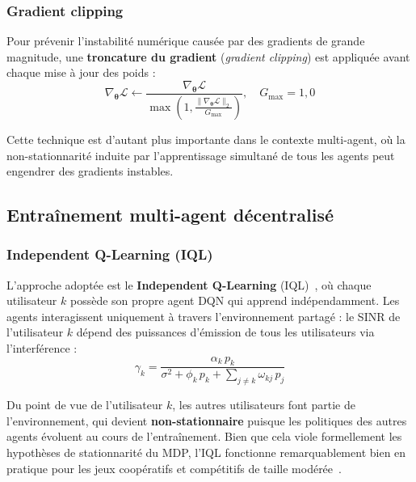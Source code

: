 \documentclass[conference]{IEEEtran}
\begin{document}
\subsubsection{Gradient clipping}
\label{sec:grad_clip}

Pour prévenir l'instabilité numérique causée par des gradients de grande magnitude, une \textbf{troncature du gradient} (\textit{gradient clipping}) est appliquée avant chaque mise à jour des poids :
\begin{equation}
    \nabla_{\boldsymbol{\theta}} \mathcal{L} \leftarrow \frac{\nabla_{\boldsymbol{\theta}} \mathcal{L}}{\max\!\left(1, \frac{\|\nabla_{\boldsymbol{\theta}} \mathcal{L}\|_2}{G_{\max}}\right)}, \quad G_{\max} = 1{,}0
    \label{eq:grad_clip}
\end{equation}

Cette technique est d'autant plus importante dans le contexte multi-agent, où la non-stationnarité induite par l'apprentissage simultané de tous les agents peut engendrer des gradients instables.

\subsection{Entraînement multi-agent décentralisé}
\label{sec:multi_agent}

\subsubsection{Independent Q-Learning (IQL)}

L'approche adoptée est le \textbf{Independent Q-Learning} (IQL)~\cite{tan1993}, où chaque utilisateur $k$ possède son propre agent DQN qui apprend indépendamment. Les agents interagissent uniquement à travers l'environnement partagé : le SINR de l'utilisateur $k$ dépend des puissances d'émission de tous les utilisateurs via l'interférence :
\begin{equation}
    \gamma_k = \frac{\alpha_k \, p_k}{\sigma^2 + \phi_k \, p_k + \sum_{j \neq k} \omega_{kj} \, p_j}
    \label{eq:sinr_coupling}
\end{equation}

Du point de vue de l'utilisateur $k$, les autres utilisateurs font partie de l'environnement, qui devient \textbf{non-stationnaire} puisque les politiques des autres agents évoluent au cours de l'entraînement. Bien que cela viole formellement les hypothèses de stationnarité du MDP, l'IQL fonctionne remarquablement bien en pratique pour les jeux coopératifs et compétitifs de taille modérée~\cite{lanctot2017}.
\end{document}
